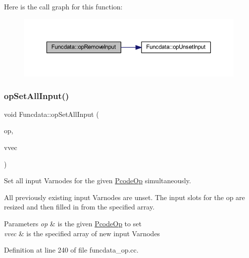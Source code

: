 Here is the call graph for this function\+:
\nopagebreak
\begin{figure}[H]
\begin{center}
\leavevmode
\includegraphics[width=350pt]{class_funcdata_a84937c2241ea5679280223cc0ec8b202_cgraph}
\end{center}
\end{figure}
\mbox{\label{class_funcdata_adcad3bfd56955103a031fa6d0e78acec}} 
\subsubsection{\texorpdfstring{opSetAllInput()}{opSetAllInput()}}
{\footnotesize\ttfamily void Funcdata\+::op\+Set\+All\+Input (\begin{DoxyParamCaption}\item[{\mbox{\hyperlink{class_pcode_op}{Pcode\+Op}} $\ast$}]{op,  }\item[{const vector$<$ \mbox{\hyperlink{class_varnode}{Varnode}} $\ast$ $>$ \&}]{vvec }\end{DoxyParamCaption})}



Set all input Varnodes for the given \mbox{\hyperlink{class_pcode_op}{Pcode\+Op}} simultaneously. 

All previously existing input Varnodes are unset. The input slots for the op are resized and then filled in from the specified array. 
\begin{DoxyParams}{Parameters}
{\em op} & is the given \mbox{\hyperlink{class_pcode_op}{Pcode\+Op}} to set \\
\hline
{\em vvec} & is the specified array of new input Varnodes \\
\hline
\end{DoxyParams}


Definition at line 240 of file funcdata\+\_\+op.\+cc.

